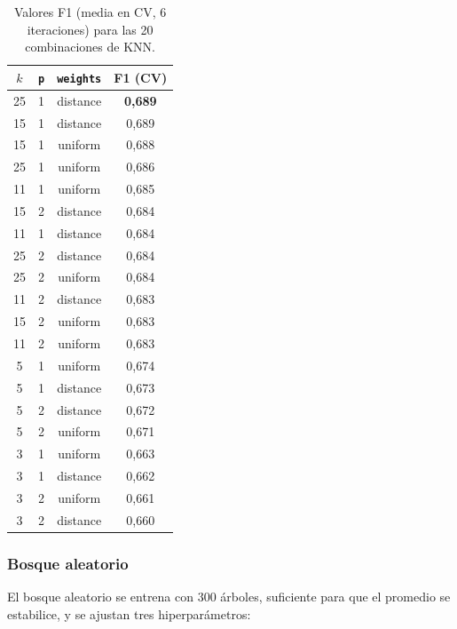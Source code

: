 \documentclass[12pt,a4paper]{report}
\theoremstyle{definition}
\newcommand{\tc}[1]{\texttt{#1}}
\begin{document}
\begin{table}[H]
\centering\footnotesize
\begin{tabular}{cccc}
\toprule
$k$ & \tc{p} & \tc{weights} & F1 (CV) \\
\midrule
25 & 1 & distance & \textbf{0,689} \\
15 & 1 & distance & 0,689 \\
15 & 1 & uniform & 0,688 \\
25 & 1 & uniform & 0,686 \\
11 & 1 & uniform & 0,685 \\
15 & 2 & distance & 0,684 \\
11 & 1 & distance & 0,684 \\
25 & 2 & distance & 0,684 \\
25 & 2 & uniform & 0,684 \\
11 & 2 & distance & 0,683 \\
15 & 2 & uniform & 0,683 \\
11 & 2 & uniform & 0,683 \\
5 & 1 & uniform & 0,674 \\
5 & 1 & distance & 0,673 \\
5 & 2 & distance & 0,672 \\
5 & 2 & uniform & 0,671 \\
3 & 1 & uniform & 0,663 \\
3 & 1 & distance & 0,662 \\
3 & 2 & uniform & 0,661 \\
3 & 2 & distance & 0,660 \\
\bottomrule
\end{tabular}
\caption{Valores F1 (media en CV, 6 iteraciones) para las 20 combinaciones de KNN.}
\label{tab:grid-knn}
\end{table}

\subsubsection{Bosque aleatorio}

El bosque aleatorio se entrena con $300$ árboles, suficiente para que el promedio se estabilice, y se
ajustan tres hiperparámetros:
\end{document}
